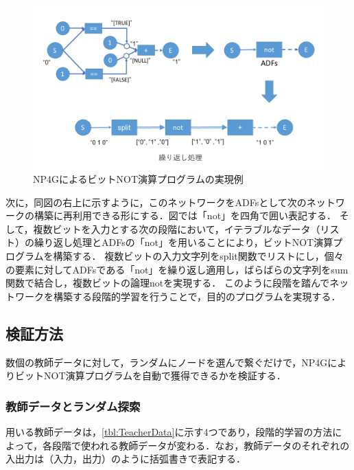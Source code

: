 \documentclass[exploratorypaper]{jsaiart} %
\begin{document}
\begin{figure}[t]
    \begin{center}
        \includegraphics[width=150mm]{bitwise_not.png}
    \end{center}
    \capwidth=130mm %
    \caption{NP4GによるビットNOT演算プログラムの実現例}
    \label{fig:bitwise_not}
\end{figure}

次に，同図の右上に示すように，このネットワークをADFsとして次のネットワークの構築に再利用できる形にする．図では「not」を四角で囲い表記する．
そして，複数ビットを入力とする次の段階において，イテラブルなデータ（リスト）の繰り返し処理とADFsの「not」を用いることにより，ビットNOT演算プログラムを構築する．
複数ビットの入力文字列をsplit関数でリストにし，個々の要素に対してADFsである「not」を繰り返し適用し，ばらばらの文字列をsum関数で結合し，複数ビットの論理notを実現する．
このように段階を踏んでネットワークを構築する段階的学習を行うことで，目的のプログラムを実現する．

\subsection{検証方法}
数個の教師データに対して，ランダムにノードを選んで繋ぐだけで，NP4GによりビットNOT演算プログラムを自動で獲得できるかを検証する．

\subsubsection{教師データとランダム探索}
用いる教師データは，\ref{tbl:TeacherData}に示す4つであり，段階的学習の方法によって，各段階で使われる教師データが変わる．なお，教師データのそれぞれの入出力は（入力，出力）のように括弧書きで表記する．
\end{document}
